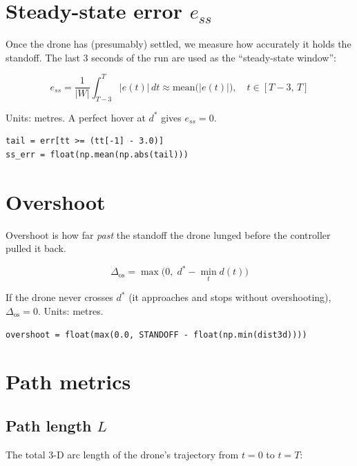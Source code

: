 \documentclass[11pt,a4paper]{article}
\begin{document}
\section{Steady-state error \boldmath$e_{ss}$}

Once the drone has (presumably) settled, we measure how accurately it holds
the standoff.  The last 3 seconds of the run are used as the ``steady-state
window'':

\[
  e_{ss} = \frac{1}{|W|} \int_{T-3}^{T} |e(t)|\, dt
         \approx \mathrm{mean}\bigl(|e(t)|\bigr),\quad t \in [T-3,\, T]
\]

Units: metres.  A perfect hover at $d^*$ gives $e_{ss} = 0$.

\begin{lstlisting}
tail = err[tt >= (tt[-1] - 3.0)]
ss_err = float(np.mean(np.abs(tail)))
\end{lstlisting}

\section{Overshoot}

Overshoot is how far \emph{past} the standoff the drone lunged before the
controller pulled it back.

\[
  \Delta_{\mathrm{os}} = \max\!\bigl(0,\; d^* - \min_{t} d(t)\bigr)
\]

If the drone never crosses $d^*$ (it approaches and stops without
overshooting), $\Delta_{\mathrm{os}} = 0$.  Units: metres.

\begin{lstlisting}
overshoot = float(max(0.0, STANDOFF - float(np.min(dist3d))))
\end{lstlisting}

\section{Path metrics}

\subsection{Path length \boldmath$L$}

The total 3-D arc length of the drone's trajectory from $t=0$ to $t=T$:
\end{document}
